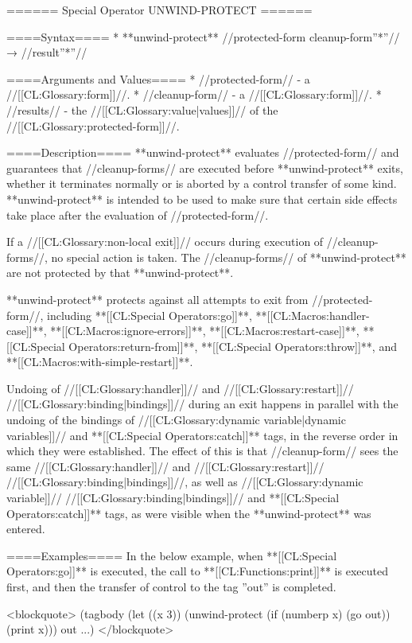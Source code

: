 ====== Special Operator UNWIND-PROTECT ======

====Syntax====
  * **unwind-protect** //protected-form cleanup-form''*''// → //result''*''//

====Arguments and Values====
  * //protected-form// - a //[[CL:Glossary:form]]//.
  * //cleanup-form// - a //[[CL:Glossary:form]]//.
  * //results// - the //[[CL:Glossary:value|values]]// of the //[[CL:Glossary:protected-form]]//.

====Description====
**unwind-protect** evaluates //protected-form// and guarantees that //cleanup-forms// are executed before **unwind-protect** exits, whether it terminates normally or is aborted by a control transfer of some kind. **unwind-protect** is intended to be used to make sure that certain side effects take place after the evaluation of //protected-form//.

If a //[[CL:Glossary:non-local exit]]// occurs during execution of //cleanup-forms//, no special action is taken. The //cleanup-forms// of **unwind-protect** are not protected by that **unwind-protect**.

**unwind-protect** protects against all attempts to exit from //protected-form//, including **[[CL:Special Operators:go]]**, **[[CL:Macros:handler-case]]**, **[[CL:Macros:ignore-errors]]**, **[[CL:Macros:restart-case]]**, **[[CL:Special Operators:return-from]]**, **[[CL:Special Operators:throw]]**, and **[[CL:Macros:with-simple-restart]]**.

Undoing of //[[CL:Glossary:handler]]// and //[[CL:Glossary:restart]]// //[[CL:Glossary:binding|bindings]]// during an exit happens in parallel with the undoing of the bindings of //[[CL:Glossary:dynamic variable|dynamic variables]]// and **[[CL:Special Operators:catch]]** tags, in the reverse order in which they were established. The effect of this is that //cleanup-form// sees the same //[[CL:Glossary:handler]]// and //[[CL:Glossary:restart]]// //[[CL:Glossary:binding|bindings]]//, as well as //[[CL:Glossary:dynamic variable]]// //[[CL:Glossary:binding|bindings]]// and **[[CL:Special Operators:catch]]** tags, as were visible when the **unwind-protect** was entered.

====Examples==== 
In the below example, when **[[CL:Special Operators:go]]** is executed, the call to **[[CL:Functions:print]]** is executed first, and then the transfer of control to the tag ''out'' is completed.

<blockquote>
(tagbody 
   (let ((x 3)) 
     (unwind-protect 
         (if (numberp x) (go out)) 
       (print x))) 
 out 
   ...)
</blockquote>

